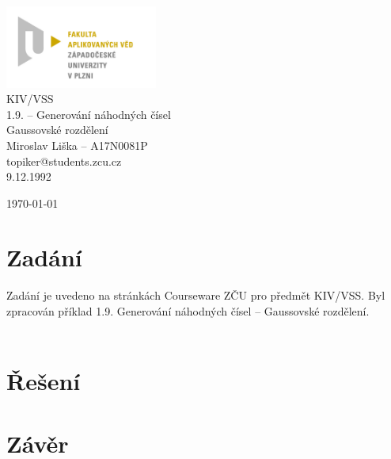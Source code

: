 \documentclass{article}
\begin{document}


\begin{titlepage}	
	\begin{center}
		\includegraphics[width=5cm]{logo.jpg}\\[3.5cm]
		{\Huge KIV/VSS}\\[0.5cm]
		{\Large 1.9. – Generování náhodných čísel}\\[0.5cm]
		{\large  Gaussovské rozdělení}\\[4.5cm]
		{\large  Miroslav Liška – A17N0081P}\\[0.5cm]
		{\large  topiker@students.zcu.cz}\\[0.5cm]
		{\large   9.12.1992}\\[0.5cm]
		\vfill

		{\large \today}

	\end{center}
\end{titlepage}



\section{Zadání} %
\setcounter{page}{1}
Zadání je uvedeno na stránkách Courseware ZČU pro předmět KIV/VSS. Byl zpracován příklad 1.9. Generování náhodných čísel – Gaussovské rozdělení.\\\\
 \section{Řešení}
\section{Závěr} %
\end{document}
